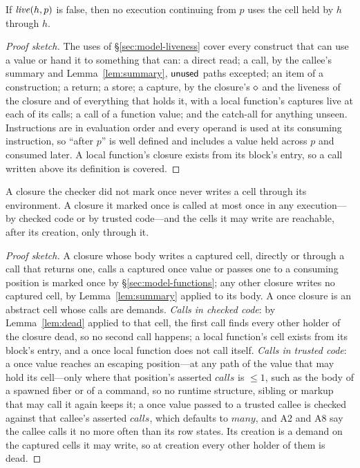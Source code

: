 \begin{lemma}
\label{lem:live}
If $\mathit{live}(h, p)$ is false, then no execution continuing from $p$ uses the cell held by $h$ through $h$.
\end{lemma}
\begin{proof}[Proof sketch]
The uses of \S\ref{sec:model-liveness} cover every construct that can use a value or hand it to
something that can: a direct read; a call, by the callee's summary and Lemma~\ref{lem:summary},
$\mathsf{unused}$ paths excepted; an item of a construction; a return; a store; a capture, by the closure's
$\diamond$ and the liveness of the closure and of everything that holds it, with a local function's
captures live at each of its calls; a call of a function value; and the catch-all for anything unseen.
Instructions are in evaluation order and every operand is used at its consuming instruction, so ``after
$p$'' is well defined and includes a value held across $p$ and consumed later. A local function's
closure exists from its block's entry, so a call written above its definition is covered.
\end{proof}

\begin{lemma}
\label{lem:once}
A closure the checker did not mark once never writes a cell through its environment. A closure it
marked once is called at most once in any execution---by checked code or by trusted code---and the cells
it may write are reachable, after its creation, only through it.
\end{lemma}
\begin{proof}[Proof sketch]
A closure whose body writes a captured cell, directly or through a call that returns one, calls a
captured once value or passes one to a consuming position is marked once by \S\ref{sec:model-functions};
any other closure writes no captured cell, by Lemma~\ref{lem:summary} applied to its body. A once
closure is an abstract cell whose calls are demands. \emph{Calls in checked code}: by
Lemma~\ref{lem:dead} applied to that cell, the first call finds every other holder of the closure dead,
so no second call happens; a local function's cell exists from its block's entry, and a once local
function does not call itself. \emph{Calls in trusted code}: a once value reaches an escaping position---at
any path of the value that may hold its cell---only where that position's asserted $\mathit{calls}$ is
${\le}1$, such as the body of a spawned fiber or of a command, so no runtime structure, sibling or markup
that may call it again keeps it; a once value passed to a trusted callee is checked against that callee's asserted $\mathit{calls}$, which defaults to $\mathit{many}$, and A2 and A8
say the callee calls it no more often than its row states. Its creation is a demand on the captured cells
it may write, so at creation every other holder of them is dead.
\end{proof}

